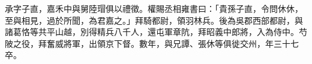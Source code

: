 
\begin{pinyinscope}
承字子直，嘉禾中與舅陸瑁俱以禮徵。權賜丞相雍書曰：「貴孫子直，令問休休，至與相見，過於所聞，為君嘉之。」拜騎都尉，領羽林兵。後為吳郡西部都尉，與諸葛恪等共平山越，別得精兵八千人，還屯軍章阬，拜昭義中郎將，入為侍中。芍陂之役，拜奮威將軍，出領京下督。數年，與兄譚、張休等俱徙交州，年三十七卒。


\end{pinyinscope}